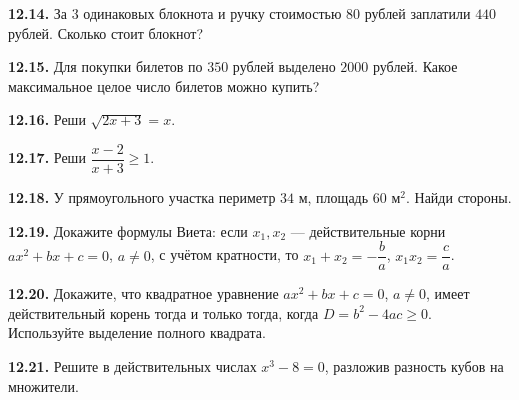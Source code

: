 \noindent\begin{minipage}[t]{\linewidth}\textbf{12.14.} За \(3\) одинаковых блокнота и ручку стоимостью \(80\) рублей заплатили \(440\) рублей. Сколько стоит блокнот?\par\end{minipage}\par
\noindent\begin{minipage}[t]{\linewidth}\textbf{12.15.} Для покупки билетов по \(350\) рублей выделено \(2000\) рублей. Какое максимальное целое число билетов можно купить?\par\end{minipage}\par
\noindent\begin{minipage}[t]{\linewidth}\textbf{12.16.}\starmark{} Реши \(\sqrt{2 x + 3} = x\).\par\end{minipage}\par
\noindent\begin{minipage}[t]{\linewidth}\textbf{12.17.}\starmark{} Реши \(\dfrac{x - 2}{x + 3} \ge  1\).\par\end{minipage}\par
\noindent\begin{minipage}[t]{\linewidth}\textbf{12.18.}\starmark{} У прямоугольного участка периметр \(34\) м, площадь \(60\) м\(^{2}\). Найди стороны.\par\end{minipage}\par
\noindent\begin{minipage}[t]{\linewidth}\textbf{12.19.} Докажите формулы Виета: если \(x_1,x_2\) — действительные корни \(ax^2+bx+c=0\), \(a\neq0\), с учётом кратности, то \(x_1+x_2=-\dfrac ba\), \(x_1x_2=\dfrac ca\).\par\end{minipage}\par
\noindent\begin{minipage}[t]{\linewidth}\textbf{12.20.} Докажите, что квадратное уравнение \(ax^2+bx+c=0\), \(a\neq0\), имеет действительный корень тогда и только тогда, когда \(D=b^2-4ac\geq0\). Используйте выделение полного квадрата.\par\end{minipage}\par
\noindent\begin{minipage}[t]{\linewidth}\textbf{12.21.} Решите в действительных числах \(x^3-8=0\), разложив разность кубов на множители.\par\end{minipage}\par
